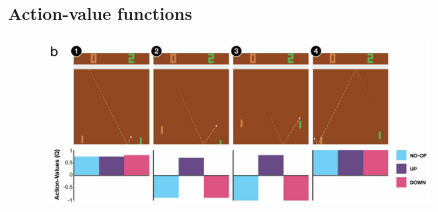 \begin{frame}
    \frametitle{Action-value functions}
    \begin{figure}
        \centering
        \includegraphics[width=0.9\textwidth]{./imgs/img_rl_qfunction_intuition.png}
    \end{figure}
\end{frame}